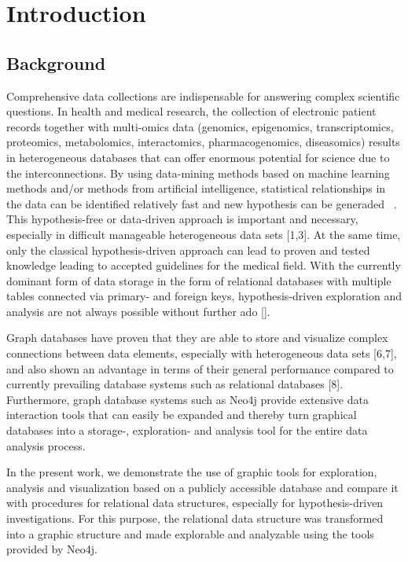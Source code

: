 \documentclass[aac]{iosart2x}
\begin{document}

\section{Introduction}\label{s1}

\subsection{Background}\label{s1.1}
Comprehensive data collections are indispensable for answering complex scientific questions. In health and medical research, the collection of electronic patient records together with multi-omics data (genomics, epigenomics, transcriptomics, proteomics, metabolomics, interactomics, pharmacogenomics, diseasomics) results in heterogeneous databases that can offer enormous potential for science due to the interconnections. By using data-mining methods based on machine learning methods and/or methods from artificial intelligence, statistical relationships in the data can be identified relatively fast and new hypothesis can be generaded ~\cite{Lysenko.2016, Himmelstein.2015}. This hypothesis-free or data-driven approach is important and necessary, especially in difficult manageable heterogeneous data sets [1,3]. At the same time, only the classical hypothesis-driven approach can lead to proven and tested knowledge leading to accepted guidelines for the medical field. With the currently dominant form of data storage in the form of relational databases with multiple tables connected via primary- and foreign keys, hypothesis-driven exploration and analysis are not always possible without further ado [].

Graph databases have proven that they are able to store and visualize complex connections between data elements, especially with heterogeneous data sets [6,7], and also shown an advantage in terms of their general performance compared to currently prevailing database systems such as relational databases [8]. Furthermore, graph database systems such as Neo4j provide extensive data interaction tools that can easily be expanded and thereby turn graphical databases into a storage-, exploration- and analysis tool for the entire data analysis process.

In the present work, we demonstrate the use of graphic tools for exploration, analysis and visualization based on a publicly accessible database and compare it with procedures for relational data structures, especially for hypothesis-driven investigations. For this purpose, the relational data structure was transformed into a graphic structure and made explorable and analyzable using the tools provided by Neo4j. 
\end{document}
